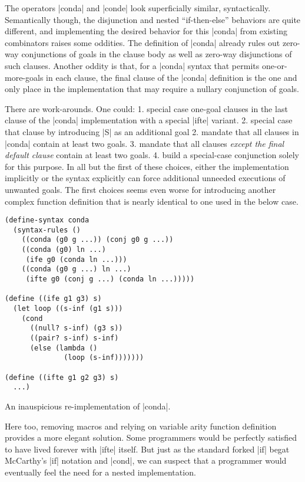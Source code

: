 \documentclass[sigplan,screen,draft,anonymous,review,natbib=false]{acmart}
\begin{document}
The operators \rackinline|conda| and \rackinline|conde| look
superficially similar, syntactically. Semantically though, the
disjunction and nested \enquote{if-then-else} behaviors are quite
different, and implementing the desired behavior for this
\rackinline|conda| from existing combinators raises some oddities. The
definition of \rackinline|conda| already rules out zero-way
conjunctions of goals in the clause body as well as zero-way
disjunctions of such clauses. Another oddity is that, for a
\rackinline|conda| syntax that permits one-or-more-goals in each
clause, the final clause of the \rackinline|conda| definition is the
one and only place in the implementation that may require a nullary
conjunction of goals.

There are work-arounds. One could: 1. special case one-goal clauses in
the last clause of the \rackinline|conda| implementation with a
special \rackinline|ifte| variant. 2. special case that clause by
introducing \rackinline|S| as an additional goal 2. mandate that all
clauses in \rackinline|conda| contain at least two goals. 3. mandate
that all clauses \emph{except the final default clause} contain at
least two goals. 4. build a special-case conjunction solely for this
purpose. In all but the first of these choices, either the
implementation implicitly or the syntax explicitly can force
additional unneeded executions of unwanted goals. The first choices
seems even worse for introducing another complex function definition
that is nearly identical to one used in the below case.

\begin{listing}
  \begin{verbatim}
(define-syntax conda
  (syntax-rules ()
    ((conda (g0 g ...)) (conj g0 g ...))
    ((conda (g0) ln ...)
     (ife g0 (conda ln ...)))
    ((conda (g0 g ...) ln ...)
     (ifte g0 (conj g ...) (conda ln ...)))))

(define ((ife g1 g3) s)
  (let loop ((s-inf (g1 s)))
    (cond
      ((null? s-inf) (g3 s))
      ((pair? s-inf) s-inf)
      (else (lambda ()
              (loop (s-inf)))))))

(define ((ifte g1 g2 g3) s)
  ...)
  \end{verbatim}
  \caption{An inauspicious re-implementation of \rackinline|conda|.}
  \label{mnt:conda-bad-re-implementation}
\end{listing}

Here too, removing macros and relying on variable arity function
definition provides a more elegant solution. Some programmers would be
perfectly satisfied to have lived forever with \rackinline|ifte|
itself. But just as the standard forked \rackinline|if| begat
McCarthy's \rackinline|if| notation and \rackinline|cond|, we can
suspect that a programmer would eventually feel the need for a nested
implementation.
\end{document}
